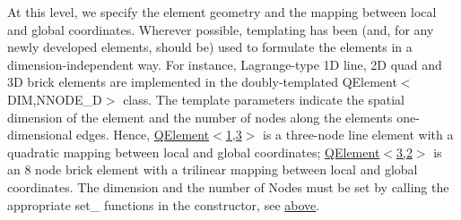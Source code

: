 At this level, we specify the element geometry and the mapping between local and global coordinates. Wherever possible, templating has been (and, for any newly developed elements, should be) used to formulate the elements in a dimension-\/independent way. For instance, Lagrange-\/type 1D line, 2D quad and 3D brick elements are implemented in the doubly-\/templated {\ttfamily Q\+Element$<$\+D\+I\+M,\+N\+N\+O\+D\+E\+\_\+D$>$} class. The template parameters indicate the spatial dimension of the element and the number of nodes along the element\textquotesingle{}s one-\/dimensional edges. Hence, {\ttfamily \hyperlink{classoomph_1_1QElement}{Q\+Element$<$1,3$>$}} is a three-\/node line element with a quadratic mapping between local and global coordinates; {\ttfamily \hyperlink{classoomph_1_1QElement}{Q\+Element$<$3,2$>$}} is an 8 node brick element with a trilinear mapping between local and global coordinates. The dimension and the number of {\ttfamily Nodes} must be set by calling the appropriate {\ttfamily set\+\_\+} functions in the constructor, see \hyperlink{index_set_commands}{above}.

